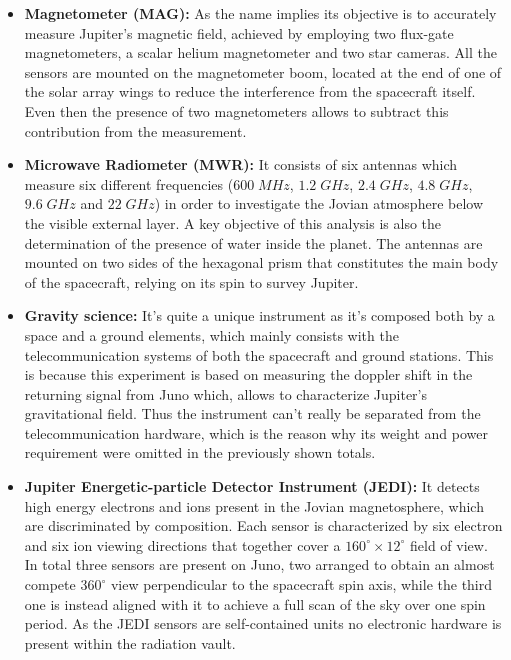 \begin{itemize}
    \item \textbf{Magnetometer (MAG):} As the name implies its objective is to accurately measure Jupiter's magnetic field, achieved by employing two flux-gate magnetometers, a scalar helium magnetometer and two star cameras. All the sensors are mounted on the magnetometer boom, located at the end of one of the solar array wings to reduce the interference from the spacecraft itself. Even then the presence of two magnetometers allows to subtract this contribution from the measurement.
    
    \item \textbf{Microwave Radiometer (MWR):} It consists of six antennas which measure six different frequencies ($600 \;MHz$, $1.2 \;GHz$, $2.4 \;GHz$, $4.8 \;GHz$, $9.6 \;GHz$ and $22 \;GHz$) in order to investigate the Jovian atmosphere below the visible external layer. A key objective of this analysis is also the determination of the presence of water inside the planet. The antennas are mounted on two sides of the hexagonal prism that constitutes the main body of the spacecraft, relying on its spin to survey Jupiter.
    
    \item \textbf{Gravity science:} It's quite a unique instrument as it's composed both by a space and a ground elements, which mainly consists with the telecommunication systems of both the spacecraft and ground stations. This is because this experiment is based on measuring the doppler shift in the returning signal from Juno which, allows to characterize Jupiter's gravitational field. Thus the instrument can't really be separated from the telecommunication hardware, which is the reason why its weight and power requirement were omitted in the previously shown totals.
    
    \item \textbf{Jupiter Energetic-particle Detector Instrument (JEDI):} It detects high energy electrons and ions present in the Jovian magnetosphere, which are discriminated by composition. Each sensor is characterized by six electron and six ion viewing directions that together cover a $160^{\circ} \times 12^{\circ}$ field of view. In total three sensors are present on Juno, two arranged to obtain an almost compete $360^{\circ}$ view perpendicular to the spacecraft spin axis, while the third one is instead aligned with it to achieve a full scan of the sky over one spin period. As the JEDI sensors are self-contained units no electronic hardware is present within the radiation vault.


\end{itemize}
